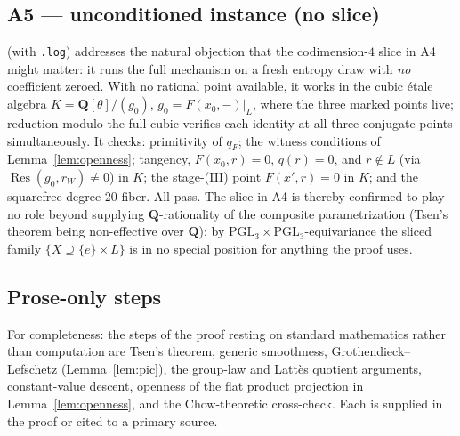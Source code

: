 \documentclass[11pt]{amsart}
\theoremstyle{definition}
\theoremstyle{remark}
\newcommand{\QQ}{\mathbf{Q}}
\newcommand{\Res}{\operatorname{Res}}
\begin{document}
\subsection*{A5 --- unconditioned instance (no slice)}
 (with \texttt{.log})
addresses the natural objection that the codimension-$4$ slice in A4 might
matter: it runs the full mechanism on a fresh entropy draw with \emph{no}
coefficient zeroed.  With no rational point available, it works in the
cubic \'etale algebra $K=\QQ[\theta]/(g_0)$, $g_0=F(x_0,-)|_L$, where the
three marked points live; reduction modulo the full cubic verifies each
identity at all three conjugate points simultaneously.  It checks:
primitivity of $q_F$; the witness conditions of Lemma~\ref{lem:openness};
tangency, $F(x_0,r)=0$, $q(r)=0$, and $r\notin L$ (via
$\Res(g_0,r_W)\ne0$) in $K$; the stage-(III) point $F(x',r)=0$ in $K$; and
the squarefree degree-$20$ fiber.  All pass.  The slice in A4 is thereby
confirmed to play no role beyond supplying $\QQ$-rationality of the
composite parametrization (Tsen's theorem being non-effective over
$\QQ$); by $\mathrm{PGL}_3\times\mathrm{PGL}_3$-equivariance the sliced
family $\{X\supseteq\{e\}\times L\}$ is in no special position for
anything the proof uses.

\subsection*{Prose-only steps}
For completeness: the steps of the proof resting on standard mathematics
rather than computation are Tsen's theorem, generic smoothness,
Grothendieck--Lefschetz (Lemma~\ref{lem:pic}), the group-law and Latt\`es
quotient arguments, constant-value descent, openness of the flat product
projection in Lemma~\ref{lem:openness}, and the Chow-theoretic cross-check.
Each is supplied in the proof or cited to a primary source.
\end{document}

